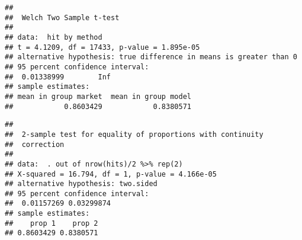 \documentclass[]{article}
\newenvironment{Shaded}{\begin{snugshade}}{\end{snugshade}}
\newcommand{\CommentTok}[1]{\textcolor[rgb]{0.56,0.35,0.01}{\textit{#1}}}
\newcommand{\DataTypeTok}[1]{\textcolor[rgb]{0.13,0.29,0.53}{#1}}
\newcommand{\DecValTok}[1]{\textcolor[rgb]{0.00,0.00,0.81}{#1}}
\newcommand{\KeywordTok}[1]{\textcolor[rgb]{0.13,0.29,0.53}{\textbf{#1}}}
\newcommand{\NormalTok}[1]{#1}
\newcommand{\OperatorTok}[1]{\textcolor[rgb]{0.81,0.36,0.00}{\textbf{#1}}}
\newcommand{\StringTok}[1]{\textcolor[rgb]{0.31,0.60,0.02}{#1}}
\begin{document}
\begin{verbatim}
## 
##  Welch Two Sample t-test
## 
## data:  hit by method
## t = 4.1209, df = 17433, p-value = 1.895e-05
## alternative hypothesis: true difference in means is greater than 0
## 95 percent confidence interval:
##  0.01338999        Inf
## sample estimates:
## mean in group market  mean in group model 
##            0.8603429            0.8380571
\end{verbatim}

\begin{Shaded}
\end{Shaded}

\begin{verbatim}
## 
##  2-sample test for equality of proportions with continuity
##  correction
## 
## data:  . out of nrow(hits)/2 %>% rep(2)
## X-squared = 16.794, df = 1, p-value = 4.166e-05
## alternative hypothesis: two.sided
## 95 percent confidence interval:
##  0.01157269 0.03299874
## sample estimates:
##    prop 1    prop 2 
## 0.8603429 0.8380571
\end{verbatim}

\begin{Shaded}
\end{Shaded}
\end{document}
